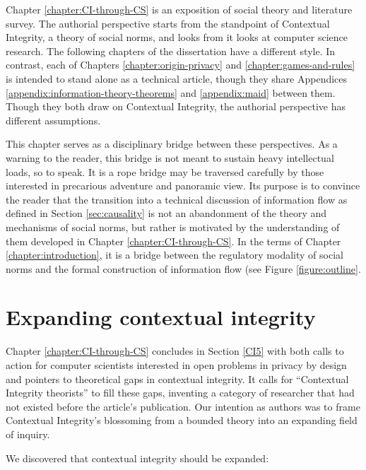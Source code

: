 \documentclass[../thesis.tex]{subfiles}
\begin{document}
 Chapter \ref{chapter:CI-through-CS} is an exposition of social theory and literature survey.
 The authorial perspective starts from the standpoint of
 Contextual Integrity, a theory of social norms,
 and looks from
 it looks at computer science research.
 The following chapters of the dissertation have
 a different style.
 In contrast, each of Chapters \ref{chapter:origin-privacy} and
 \ref{chapter:games-and-rules} is intended to stand alone as a
 technical article, though they share Appendices
 \ref{appendix:information-theory-theorems}
 and \ref{appendix:maid} between them.
 Though they both draw on Contextual Integrity, the authorial perspective has different assumptions.

 This chapter serves as a disciplinary bridge between these perspectives.
 As a warning to the reader, this bridge is not meant to sustain heavy intellectual loads, so to speak.
 It is a rope bridge may be traversed carefully by those interested in precarious adventure and panoramic view.
 Its purpose is to convince the reader that the transition
 into a technical discussion of information flow as defined
 in Section \ref{sec:causality} is not an abandonment of
 the theory and mechanisms of social norms, but rather is
 motivated by the understanding of them developed in
 Chapter \ref{chapter:CI-through-CS}.
 In the terms of Chapter \ref{chapter:introduction}, it
 is a bridge between the regulatory modality of social norms
 and the formal construction of information flow (see Figure \ref{figure:outline}.

\section{Expanding contextual integrity}

Chapter \ref{chapter:CI-through-CS} concludes in Section \ref{CI5} with both calls to action for computer scientists interested in open problems in privacy by design and pointers to theoretical gaps in contextual integrity.
 It calls for ``Contextual Integrity theorists'' to fill these gaps, inventing a category of researcher that had not existed before the article's publication.
 Our intention as authors was to frame Contextual Integrity's blossoming from a bounded theory into an expanding field of inquiry.
 
 We discovered that contextual integrity should be expanded:
\end{document}
